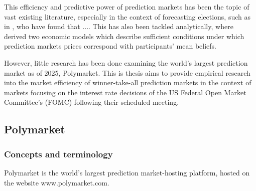 


This efficiency and predictive power of prediction markets has been the topic
of vast existing literature, especially in the context of forecasting elections, such as in
\cite{berg_prediction_2008} \cite{erikson_are_2008}, who have found that .... 
This has also been tackled analytically, where \cite{wolfers_interpreting_2006} derived two economic models which
describe sufficient conditions under which prediction markets prices correspond with participants' mean beliefs.

However, little research has been done examining the world's largest prediction market as of 2025, Polymarket.
This is thesis aims to provide empirical research into the market efficiency of winner-take-all prediction markets 
in the context of markets focusing on the interest rate decisions of the US Federal Open Market Committee's (FOMC) following their scheduled meeting.

\subsection{Polymarket}


\subsubsection{Concepts and terminology}
Polymarket is the world's largest prediction market-hosting platform, %
hosted on the website www.polymarket.com.



